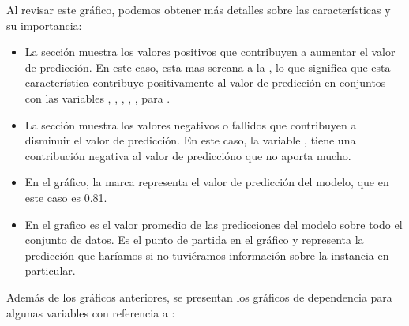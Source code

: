 Al revisar este gráfico, podemos obtener más detalles sobre las características y su importancia:

\begin{itemize}
    \item La sección  muestra los valores positivos que contribuyen a aumentar el valor de predicción. En este caso,  esta mas sercana a la , lo que significa que esta característica contribuye positivamente al valor de predicción en conjuntos con las variables , , , , ,  para .
    \item La sección  muestra los valores negativos o fallidos que contribuyen a disminuir el valor de predicción. En este caso, la variable , tiene una contribución negativa al valor de prediccióno que no aporta mucho.
    \item En el gráfico, la marca  representa el valor de predicción del modelo, que en este caso es 0.81.
    \item En el grafico  es el valor promedio de las predicciones del modelo sobre todo el conjunto de datos. Es el punto de partida en el gráfico y representa la predicción que haríamos si no tuviéramos información sobre la instancia en particular.
\end{itemize}

Además de los gráficos anteriores, se presentan los gráficos de dependencia para algunas variables con referencia a :

